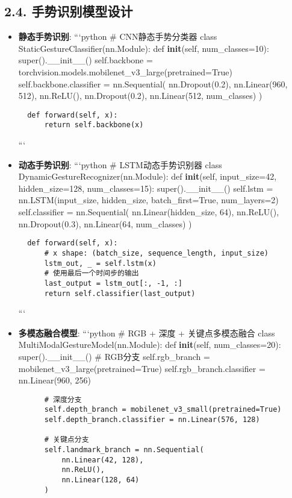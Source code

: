 \subsection{2.4.
手势识别模型设计}\label{ux624bux52bfux8bc6ux522bux6a21ux578bux8bbeux8ba1}

\begin{itemize}
\item
  \textbf{静态手势识别}: ```python \# CNN静态手势分类器 class
  StaticGestureClassifier(nn.Module): def \textbf{init}(self,
  num\_classes=10): super().\_\_init\_\_() self.backbone =
  torchvision.models.mobilenet\_v3\_large(pretrained=True)
  self.backbone.classifier = nn.Sequential( nn.Dropout(0.2),
  nn.Linear(960, 512), nn.ReLU(), nn.Dropout(0.2), nn.Linear(512,
  num\_classes) )

\begin{lstlisting}
  def forward(self, x):
      return self.backbone(x)
\end{lstlisting}

  ```
\item
  \textbf{动态手势识别}: ```python \# LSTM动态手势识别器 class
  DynamicGestureRecognizer(nn.Module): def \textbf{init}(self,
  input\_size=42, hidden\_size=128, num\_classes=15):
  super().\_\_init\_\_() self.lstm = nn.LSTM(input\_size, hidden\_size,
  batch\_first=True, num\_layers=2) self.classifier = nn.Sequential(
  nn.Linear(hidden\_size, 64), nn.ReLU(), nn.Dropout(0.3), nn.Linear(64,
  num\_classes) )

\begin{lstlisting}
  def forward(self, x):
      # x shape: (batch_size, sequence_length, input_size)
      lstm_out, _ = self.lstm(x)
      # 使用最后一个时间步的输出
      last_output = lstm_out[:, -1, :]
      return self.classifier(last_output)
\end{lstlisting}

  ```
\item
  \textbf{多模态融合模型}: ```python \# RGB + 深度 + 关键点多模态融合
  class MultiModalGestureModel(nn.Module): def \textbf{init}(self,
  num\_classes=20): super().\_\_init\_\_() \# RGB分支 self.rgb\_branch =
  mobilenet\_v3\_large(pretrained=True) self.rgb\_branch.classifier =
  nn.Linear(960, 256)

\begin{lstlisting}
      # 深度分支
      self.depth_branch = mobilenet_v3_small(pretrained=True)
      self.depth_branch.classifier = nn.Linear(576, 128)

      # 关键点分支
      self.landmark_branch = nn.Sequential(
          nn.Linear(42, 128),
          nn.ReLU(),
          nn.Linear(128, 64)
      )


\end{lstlisting}
\end{itemize}
